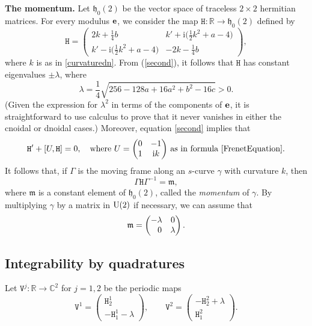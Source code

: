 \documentclass[10pt,a4paper]{amsart}
\newcommand\kk{k} %
\def\ri{\mathrm{i}}
\def\gam{\gamma} %
\def\C{\mathbb C}
\def\R{\mathbb R}
\newcommand\be{{\bf e}}
\numberwithin{equation}{section}
\begin{document}
{\bf The momentum.}
Let $\mathfrak{h}_0(2)$ be the vector space of traceless $2\times 2$ hermitian matrices. For every modulus $\be$, we consider the map ${\mathtt H}\colon \R\to \mathfrak {h}_0(2)$ defined by
\begin{equation}\label{hamiltonian}
{\mathtt H}=
\begin{pmatrix}
2\kk + \tfrac14 b & \kk' + \ri\bigl(\tfrac12 \kk^2 + a-4\bigr) \\
\kk' - \ri\bigl(\tfrac12 \kk^2 + a-4\bigr) & -2\kk -\tfrac14 b
\end{pmatrix},
\end{equation}
where $\kk$ is as in \eqref{curvaturedn}. From (\ref{second}), it follows that ${\mathtt H}$ has constant eigenvalues $\pm \lambda$, where
\[\lambda=\frac{1}{4}\sqrt{256-128a+16a^2+b^2-16c}>0.\]
\big(Given the expression for $\lambda^2$ in terms of the components of $\be$, it is straightforward to
use calculus to prove that it never vanishes in either the cnoidal or dnoidal cases.\big)
Moreover, equation \eqref{second} implies that
\[
{\mathtt H}'+[U, {\mathtt H}]=0, \quad
\text{where $U = \begin{pmatrix} 0 & -1 \\ 1 & \ri \kk\end{pmatrix}$ as in formula~\eqref{FrenetEquation}.}
\]
It follows that, if $\Gamma$ is the moving frame along an $s$-curve $\gam$ with curvature $\kk$, then
\begin{equation}\label{momentum2}\Gamma  {\mathtt H}  \Gamma^{-1}={\mathfrak m},\end{equation}
where ${\mathfrak m}$ is a constant element of ${\mathfrak h}_0(2)$, called the {\it momentum} of $\gamma$. By multiplying $\gam$ by a matrix in ${\rm U}(2)$ if necessary, we can assume that
\begin{equation}\label{simconf}{\mathfrak m}=\begin{pmatrix} -\lambda &0 \\ \hphantom{-}0 &\lambda\end{pmatrix}.\end{equation}

\subsection{Integrability by quadratures}\label{quadsec}
Let ${\mathtt V}^j\colon \R\to \C^2$ for $j=1,2$ be the periodic maps
\begin{equation}\label{Vdefs}
{\mathtt V}^1 = \begin{pmatrix}{\mathtt H}^1_2 \\ -{\mathtt H}^1_1-\lambda\end{pmatrix},\qquad
{\mathtt V}^2 = \begin{pmatrix}-{\mathtt H}^2_2+\lambda \\ {\mathtt H}^2_1\end{pmatrix}.
\end{equation}
\end{document}
